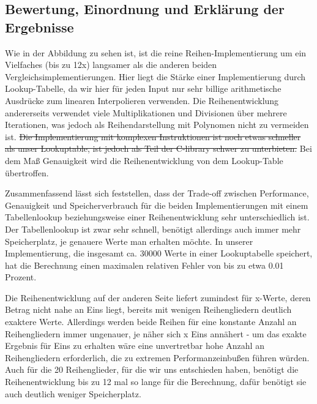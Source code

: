 \documentclass[course=erap] {aspdoc}
\begin{document}

    \subsection{Bewertung, Einordnung und Erklärung der Ergebnisse}
    Wie in der Abbildung zu sehen ist, ist die reine Reihen-Implementierung um ein Vielfaches (bis zu 12x) langsamer als die anderen
    beiden Vergleichsimplementierungen.
    Hier liegt die Stärke einer Implementierung durch Lookup-Tabelle, da wir hier für jeden
    Input nur sehr billige arithmetische Ausdrücke zum linearen Interpolieren verwenden.
    Die Reihenentwicklung andererseits verwendet viele Multiplikationen und Divisionen über mehrere Iterationen, was jedoch als Reihendarstellung mit Polynomen nicht zu vermeiden ist.
    \sout{Die Implementierung mit komplexen Instruktionen ist noch etwas schneller als unser Lookuptable, ist jedoch als Teil der
    C-library schwer zu unterbieten.} Bei dem Maß Genauigkeit wird die Reihenentwicklung von dem Lookup-Table übertroffen.

    Zusammenfassend lässt sich feststellen, dass der Trade-off zwischen Performance, Genauigkeit und Speicherverbrauch für die beiden Implementierungen mit einem Tabellenlookup beziehungsweise einer Reihenentwicklung sehr unterschiedlich ist.
    Der Tabellenlookup ist zwar sehr schnell, benötigt allerdings auch immer mehr Speicherplatz, je genauere Werte man erhalten möchte.
    In unserer Implementierung, die insgesamt ca. 30000 Werte in einer Lookuptabelle speichert, hat die Berechnung einen maximalen relativen Fehler von bis zu etwa 0.01 Prozent.

    Die Reihenentwicklung auf der anderen Seite liefert zumindest für x-Werte, deren Betrag nicht nahe an Eins liegt, bereits mit wenigen Reihengliedern deutlich exaktere Werte.
    Allerdings werden beide Reihen für eine konstante Anzahl an Reihengliedern immer ungenauer, je näher sich x Eins annähert - um das exakte Ergebnis für Eins zu erhalten wäre eine unvertretbar hohe Anzahl an Reihengliedern erforderlich, die zu extremen Performanzeinbußen führen würden.
    Auch für die 20 Reihenglieder, für die wir uns entschieden haben, benötigt die Reihenentwicklung bis zu 12 mal so lange für die Berechnung, dafür benötigt sie auch deutlich weniger Speicherplatz.
\end{document}
